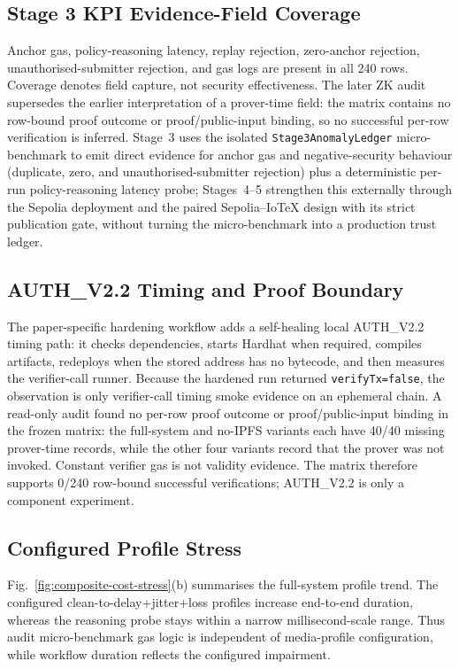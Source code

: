 \documentclass[journal]{IEEEtran}
\begin{document}
\subsection{Stage 3 KPI Evidence-Field Coverage}
Anchor gas, policy-reasoning latency, replay rejection, zero-anchor rejection,
unauthorised-submitter rejection, and gas logs are present in all 240 rows.
Coverage denotes field capture, not security effectiveness. The later ZK
audit supersedes the earlier interpretation of a prover-time field: the matrix
contains no row-bound proof outcome or proof/public-input binding, so no
successful per-row verification is inferred.
Stage~3 uses the isolated \texttt{Stage3AnomalyLedger} micro-benchmark to
emit direct evidence for anchor gas and negative-security behaviour (duplicate,
zero, and unauthorised-submitter rejection) plus a deterministic per-run
policy-reasoning latency probe; Stages~4--5 strengthen this externally through
the Sepolia deployment and the paired Sepolia--IoTeX design with its strict
publication gate, without turning the micro-benchmark into a production trust
ledger.
\subsection{AUTH\_V2.2 Timing and Proof Boundary}
\label{sec:auth-boundary}
The paper-specific hardening workflow adds a self-healing local AUTH\_V2.2
timing path: it checks dependencies, starts Hardhat when required, compiles
artifacts, redeploys when the stored address has no bytecode, and then measures
the verifier-call runner. Because the hardened run returned
\texttt{verifyTx=false}, the observation is only verifier-call timing smoke
evidence on an ephemeral chain. A read-only audit found no per-row proof
outcome or proof/public-input binding in the frozen matrix: the full-system
and no-IPFS variants each have 40/40 missing prover-time records, while the
other four variants record that the prover was not invoked. Constant verifier
gas is not validity evidence. The matrix therefore supports 0/240 row-bound
successful verifications; AUTH\_V2.2 is only a component experiment.
\subsection{Configured Profile Stress}
Fig.~\ref{fig:composite-cost-stress}(b) summarises the full-system profile
trend. The
configured clean-to-delay+jitter+loss profiles increase end-to-end duration,
whereas the reasoning probe stays within a narrow millisecond-scale
range. Thus audit micro-benchmark gas logic is independent of media-profile
configuration, while workflow duration reflects the configured impairment.

\end{document}
